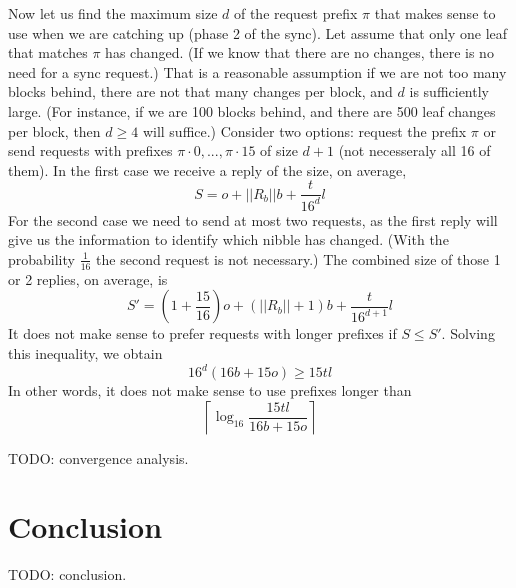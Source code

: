 \documentclass{amsart}
\begin{document}
Now let us find the maximum size $d$ of the request prefix $\pi$ that makes sense to use when we are catching up (phase 2 of the sync).
Let assume that only one leaf that matches $\pi$ has changed.
(If we know that there are no changes, there is no need for a sync request.)
That is a reasonable assumption if we are not too many blocks behind, there are not that many changes per block, and $d$ is sufficiently large.
(For instance, if we are 100 blocks behind, and there are 500 leaf changes per block, then $d \geq 4$ will suffice.)
Consider two options: request the prefix $\pi$ or send requests with prefixes $\pi \cdot 0, ..., \pi \cdot 15$ of size $d+1$
(not necesseraly all 16 of them).
In the first case we receive a reply of the size, on average,
\begin{equation}
    S = o + ||R_b|| b + \frac{t}{16^d} l
\end{equation}
For the second case we need to send at most two requests,
as the first reply will give us the information to identify which nibble has changed.
(With the probability $\frac{1}{16}$ the second request is not necessary.)
The combined size of those 1 or 2 replies, on average, is
\begin{equation}
    S' = \left( 1 + \frac{15}{16} \right) o + (||R_b|| + 1) b + \frac{t}{16^{d+1}} l
\end{equation}
It does not make sense to prefer requests with longer prefixes if $S \leq S'$.
Solving this inequality, we obtain
\begin{equation}
    16^d (16b + 15o) \geq 15tl
\end{equation}
In other words, it does not make sense to use prefixes longer than
\begin{equation}
\left\lceil \log_{16} \frac{15tl} {16b + 15o} \right\rceil
\end{equation}

TODO: convergence analysis.

\section{Conclusion}
TODO: conclusion.



\end{document}
